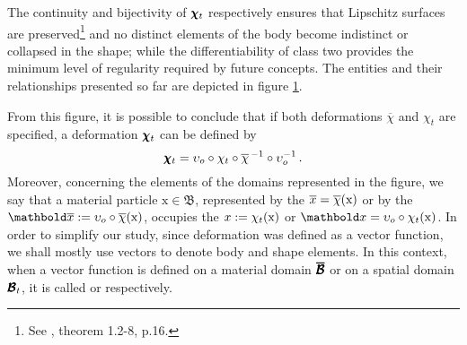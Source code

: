 The continuity and bijectivity of $\pmb{\chi}_t$ respectively ensures that Lipschitz surfaces are preserved\footnote{See \cite{ciarlet_1988_2_2}, theorem 1.2-8, p.16.} and no distinct elements of the body become indistinct or collapsed in the shape; while the differentiability of class two provides the minimum level of regularity required by future concepts. The entities and their relationships presented so far are depicted in figure \ref{fg:deformacao}. 
\begin{figure}[!ht]
\centering
\begin{center}
\scalebox{.72}{}
\end{center}
\label{fg:deformacao}
\end{figure}
From this figure, it is possible to conclude that if both deformations $\overline{\chi}$ and $\chi_t$ are specified, a deformation $\pmb{\chi}_t$ can be defined by 
\begin{equation}
\pmb{\chi}_t = \upsilon_o\circ\chi_t\circ\overline{\chi}^{\,-1}\circ\upsilon_o^{-1}\,.
\end{equation}
Moreover, concerning the elements of the domains represented in the figure, we say that a material particle $\text{x}\in\mathfrak{B}$, represented by the  $\overline{x}=\overline{\chi}(\text{x})$ or by the  $\vto{\overline{x}}:=\fua{\upsilon_o\circ\overline{\chi}}{\text{x}}$, occupies the  $x:=\chi_t(\text{x})$ or $\vto{x}=\fua{\upsilon_o\circ\chi_t}{\text{x}}$. In order to simplify our study, since deformation was defined as a vector function, we shall mostly use vectors to denote body and shape elements. In this context, when a vector function is defined on a material domain $\pmb{\overline{\mathcal{B}}}$ or on a spatial domain $\pmb{\mathcal{B}}_t$, it is called  or  respectively. 

